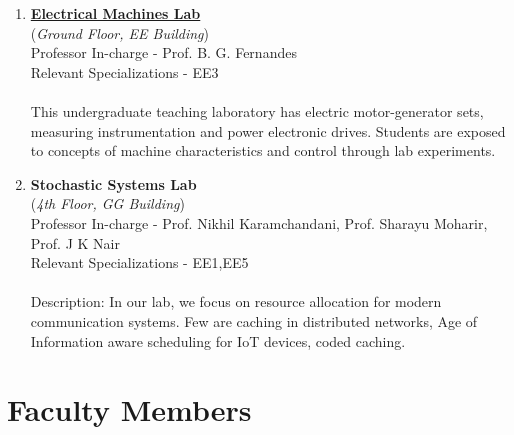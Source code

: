 \documentclass[openany]{book} %
\begin{document}
\begin{enumerate}
\item \href{http://www.ee.iitb.ac.in/emlab/} {\color{blue} \textbf{Electrical Machines Lab}}\\
    (\textit{Ground Floor, EE Building})\\
    Professor In-charge - Prof. B. G. Fernandes\\
Relevant Specializations - EE3\\
\\
This undergraduate teaching laboratory has electric motor-generator sets, measuring instrumentation and power electronic drives. Students are exposed to concepts of machine characteristics and control through lab experiments.

\item \textbf{Stochastic Systems Lab}\\
    (\textit{4th Floor, GG Building})\\
    Professor In-charge - Prof. Nikhil Karamchandani, Prof. Sharayu Moharir, Prof. J K Nair\\
Relevant Specializations - EE1,EE5\\
\\
Description: In our lab, we focus on resource allocation for modern communication systems. Few are caching in distributed networks, Age of Information aware scheduling for IoT devices, coded caching.

\end{enumerate}
\chapter{Faculty Members}
\end{document}
